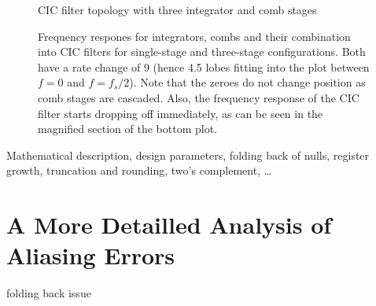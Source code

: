 \begin{figure}
    \centering
    
    \caption[CIC Filter Topology]
        {CIC filter topology with three integrator and comb stages}
    \label{fig:filtertopologies:cic}
\end{figure}

\begin{figure}
    \centering
        
        \caption[Frequency Responses for Integrators, Combs and CIC Filters]{%
            Frequency    respones   for    integrators,   combs    and   their
            combination  into CIC  filters  for  single-stage and  three-stage
            configurations. Both  have   a  rate  change  of   \num{9}  (hence
            \num{4.5} lobes  fitting into the  plot between $f  = 0$ and  $f =
            f_s/2$).\protect\newline
            Note that  the zeroes do  not change  position as comb  stages are
            cascaded. Also, the  frequency response  of the CIC  filter starts
            dropping off immediately, as can  be seen in the magnified section
            of the bottom plot.%
        }
        \label{fig:cic:freq_responses}
\end{figure}

Mathematical description,  design parameters, folding back of nulls, register
growth, truncation and rounding, two's complement, \ldots


\section{A More Detailled Analysis of Aliasing Errors} %
\label{sec:detail_aliasing}

folding back issue


